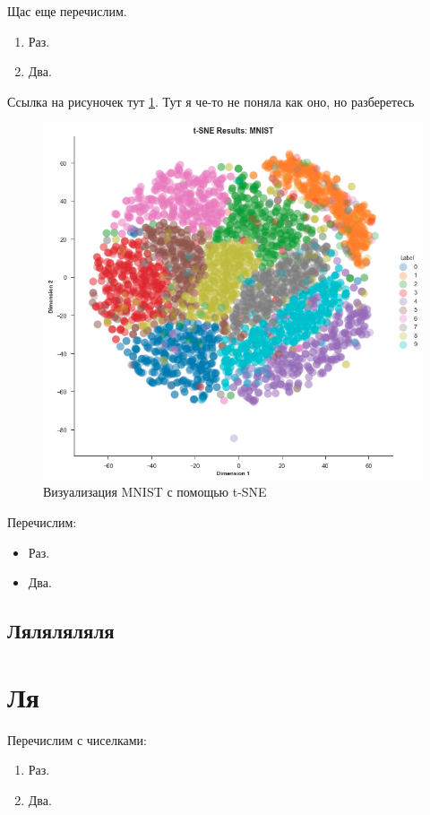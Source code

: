 Щас еще перечислим. 
\begin{enumerate}[label=\arabic*)]
    \item Раз.
    \item Два.
\end{enumerate}

Ссылка на рисуночек тут \ref{fig:crisp_dm}.
Тут я че-то не поняла как оно, но разберетесь

\begin{figure}[ht]
    \centering
    \vspace{0ex}
    \includegraphics[width=0.7\linewidth]{imgs/tsneMNIST.png}
    \caption{Визуализация MNIST с помощью t-SNE}
    \label{fig:crisp_dm}
\end{figure}


Перечислим:

\begin{itemize}[]
    \item Раз.
\end{itemize}

\begin{itemize}[]
    \item Два.
\end{itemize}

\subsection{Ляляляляля}

\section{Ля}

Перечислим с чиселками:
\begin{enumerate}[label=\arabic*)]
    \item Раз.
    \item Два.
\end{enumerate}























